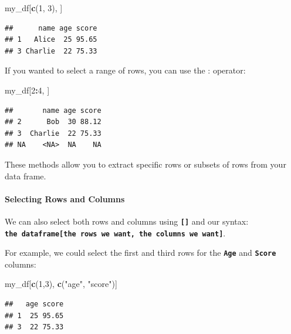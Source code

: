 \documentclass[
]{book}
\newenvironment{Shaded}{\begin{snugshade}}{\end{snugshade}}
\newcommand{\DecValTok}[1]{\textcolor[rgb]{0.00,0.00,0.81}{#1}}
\newcommand{\FunctionTok}[1]{\textcolor[rgb]{0.13,0.29,0.53}{\textbf{#1}}}
\newcommand{\NormalTok}[1]{#1}
\newcommand{\SpecialCharTok}[1]{\textcolor[rgb]{0.81,0.36,0.00}{\textbf{#1}}}
\newcommand{\StringTok}[1]{\textcolor[rgb]{0.31,0.60,0.02}{#1}}
\begin{document}
\begin{Shaded}
\begin{Highlighting}[]
\NormalTok{my\_df[}\FunctionTok{c}\NormalTok{(}\DecValTok{1}\NormalTok{, }\DecValTok{3}\NormalTok{), ]}
\end{Highlighting}
\end{Shaded}

\begin{verbatim}
##      name age score
## 1   Alice  25 95.65
## 3 Charlie  22 75.33
\end{verbatim}

If you wanted to select a range of rows, you can use the : operator:

\begin{Shaded}
\begin{Highlighting}[]
\NormalTok{my\_df[}\DecValTok{2}\SpecialCharTok{:}\DecValTok{4}\NormalTok{, ]}
\end{Highlighting}
\end{Shaded}

\begin{verbatim}
##       name age score
## 2      Bob  30 88.12
## 3  Charlie  22 75.33
## NA    <NA>  NA    NA
\end{verbatim}

These methods allow you to extract specific rows or subsets of rows from your data frame.

\paragraph{Selecting Rows and Columns}\label{selecting-rows-and-columns}

We can also select both rows and columns using \textbf{\texttt{{[}{]}}} and our syntax: \textbf{\texttt{the\ dataframe{[}the\ rows\ we\ want,\ the\ columns\ we\ want{]}}}.

For example, we could select the first and third rows for the \textbf{\texttt{Age}} and \textbf{\texttt{Score}} columns:

\begin{Shaded}
\begin{Highlighting}[]
\NormalTok{my\_df[}\FunctionTok{c}\NormalTok{(}\DecValTok{1}\NormalTok{,}\DecValTok{3}\NormalTok{), }\FunctionTok{c}\NormalTok{(}\StringTok{"age"}\NormalTok{, }\StringTok{"score"}\NormalTok{)]}
\end{Highlighting}
\end{Shaded}

\begin{verbatim}
##   age score
## 1  25 95.65
## 3  22 75.33
\end{verbatim}
\end{document}
